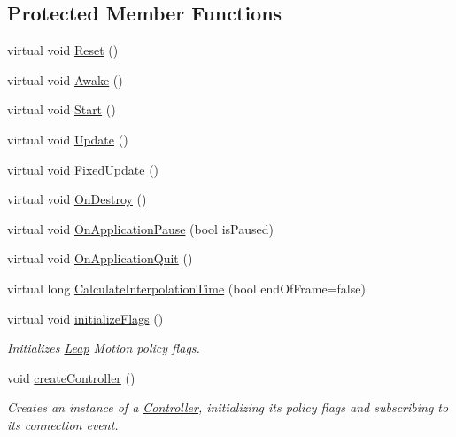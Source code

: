 \subsection*{Protected Member Functions}
\begin{DoxyCompactItemize}
\item 
virtual void \mbox{\hyperlink{class_leap_1_1_unity_1_1_leap_service_provider_af249b412176e1018f24d4628cb476316}{Reset}} ()
\item 
virtual void \mbox{\hyperlink{class_leap_1_1_unity_1_1_leap_service_provider_a0dbd5c42d7a531d4dab5f2db44035966}{Awake}} ()
\item 
virtual void \mbox{\hyperlink{class_leap_1_1_unity_1_1_leap_service_provider_aee7af248182bf0df5767cf27f55ec1ca}{Start}} ()
\item 
virtual void \mbox{\hyperlink{class_leap_1_1_unity_1_1_leap_service_provider_a8823a3e4e7c2c5f1d71dbe9a9fb937f4}{Update}} ()
\item 
virtual void \mbox{\hyperlink{class_leap_1_1_unity_1_1_leap_service_provider_a98629de6c901a83829c2210e45b4a41a}{Fixed\+Update}} ()
\item 
virtual void \mbox{\hyperlink{class_leap_1_1_unity_1_1_leap_service_provider_ae5dc9fe551328a3d46cf7700777124cb}{On\+Destroy}} ()
\item 
virtual void \mbox{\hyperlink{class_leap_1_1_unity_1_1_leap_service_provider_a13467308ac2863f83e081b2e4ca10cb7}{On\+Application\+Pause}} (bool is\+Paused)
\item 
virtual void \mbox{\hyperlink{class_leap_1_1_unity_1_1_leap_service_provider_a7843e839d89d0dccdd0ac7e5bcc5f5ce}{On\+Application\+Quit}} ()
\item 
virtual long \mbox{\hyperlink{class_leap_1_1_unity_1_1_leap_service_provider_a54a106ef4054e95402df75c45a7bc321}{Calculate\+Interpolation\+Time}} (bool end\+Of\+Frame=false)
\item 
virtual void \mbox{\hyperlink{class_leap_1_1_unity_1_1_leap_service_provider_ac6ec54a97c1d2e1bbbe663822b458140}{initialize\+Flags}} ()
\begin{DoxyCompactList}\small\item\em Initializes \mbox{\hyperlink{namespace_leap_1_1_unity_1_1_leap}{Leap}} Motion policy flags. \end{DoxyCompactList}\item 
void \mbox{\hyperlink{class_leap_1_1_unity_1_1_leap_service_provider_ac79f148cc55c9680e605c48e744971c7}{create\+Controller}} ()
\begin{DoxyCompactList}\small\item\em Creates an instance of a \mbox{\hyperlink{class_leap_1_1_controller}{Controller}}, initializing its policy flags and subscribing to its connection event. \end{DoxyCompactList}\item 

\end{DoxyCompactItemize}
